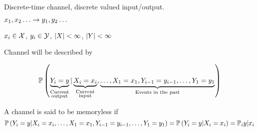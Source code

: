 Discrete-time channel, discrete valued input/output.

$x_1,x_2\ldots \rightarrow y_1, y_2\ldots$

$x_i \in \mathcal{X}$, $y_i \in \mathcal{Y}$, $\left\lvert X\right\rvert < \infty$, $\left\lvert Y\right\rvert < \infty$

Channel will be described by 

\[
    \mathbb{P}\left( \underbrace{Y_i = y}_{\substack{\text{Current}\\\text{output}}} | \underbrace{X_i=x_i}_{\substack{\text{Current}\\\text{input}}}, \underbrace{\ldots, X_1 = x_1,Y_{i-1}=y_{i-1},\ldots, Y_1=y_1}_{\text{Events in the past}} \right)
\]

A channel is said to be memoryless if
\[
    \mathbb{P}\left( Y_i = y | X_i=x_i, \ldots, X_1 = x_1,Y_{i-1}=y_{i-1},\ldots, Y_1=y_1 \right) = \mathbb{P}\left( Y_i = y | X_i=x_i \right) = \mathbb{P}_i{y\vert x_i}
\]



\nocite{*}







